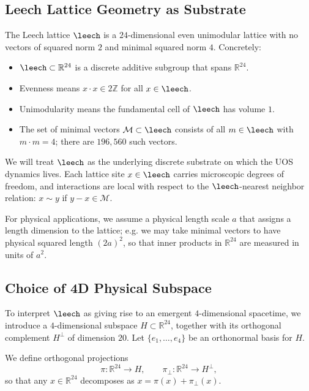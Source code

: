 \subsection{Leech Lattice Geometry as Substrate}
\label{subsec:kappa-leech-geometry}

The Leech lattice $\leech$ is a $24$-dimensional even unimodular lattice with
no vectors of squared norm $2$ and minimal squared norm $4$. Concretely:
\begin{itemize}
  \item $\leech \subset \mathbb{R}^{24}$ is a discrete additive subgroup that
        spans $\mathbb{R}^{24}$.
  \item Evenness means $x\cdot x \in 2\mathbb{Z}$ for all $x \in \leech$.
  \item Unimodularity means the fundamental cell of $\leech$ has volume $1$.
  \item The set of minimal vectors $\mathcal{M} \subset \leech$ consists of
        all $m \in \leech$ with $m\cdot m = 4$; there are $196{,}560$ such
        vectors.
\end{itemize}

We will treat $\leech$ as the underlying discrete substrate on which the UOS
dynamics lives. Each lattice site $x \in \leech$ carries microscopic degrees
of freedom, and interactions are local with respect to the $\leech$-nearest
neighbor relation: $x \sim y$ if $y - x \in \mathcal{M}$.

For physical applications, we assume a physical length scale $a$ that assigns
a length dimension to the lattice; e.g. we may take minimal vectors to have
physical squared length $(2a)^2$, so that inner products in $\mathbb{R}^{24}$
are measured in units of $a^2$.

\subsection{Choice of 4D Physical Subspace}
\label{subsec:kappa-leech-embedding}

To interpret $\leech$ as giving rise to an emergent $4$-dimensional spacetime,
we introduce a $4$-dimensional subspace $H \subset \mathbb{R}^{24}$, together
with its orthogonal complement $H^\perp$ of dimension $20$. Let
$\{e_1,\dots,e_4\}$ be an orthonormal basis for $H$.

We define orthogonal projections
\begin{equation}
  \pi : \mathbb{R}^{24} \to H, \qquad
  \pi_\perp : \mathbb{R}^{24} \to H^\perp,
\end{equation}
so that any $x \in \mathbb{R}^{24}$ decomposes as $x = \pi(x) + \pi_\perp(x)$.

